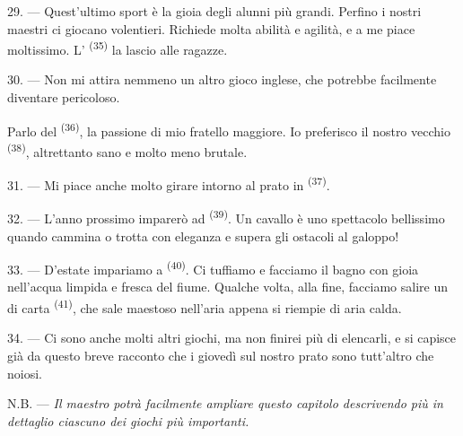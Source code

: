 29. --- Quest'ultimo sport è la gioia degli alunni più grandi. Perfino i nostri
maestri ci giocano volentieri. Richiede molta abilità e agilità, e a me piace
moltissimo. L' \textsuperscript{(35)} la lascio alle ragazze.

30. --- Non mi attira nemmeno un altro gioco inglese, che potrebbe facilmente
diventare pericoloso.

Parlo del  \textsuperscript{(36)}, la passione di mio fratello
maggiore. Io preferisco il nostro vecchio 
\textsuperscript{(38)}, altrettanto sano e molto meno brutale.

\VUsaut{4.6mm}
\VUsaut{3.0mm}

31. --- Mi piace anche molto girare intorno al prato in 
\textsuperscript{(37)}.

32. --- L'anno prossimo imparerò ad  \textsuperscript{(39)}.
Un cavallo è uno spettacolo bellissimo quando cammina o trotta con eleganza e supera
gli ostacoli al galoppo!

33. --- D'estate impariamo a  \textsuperscript{(40)}. Ci tuffiamo e
facciamo il bagno con gioia nell'acqua limpida e fresca del fiume. Qualche volta, alla
fine, facciamo salire un  di carta \textsuperscript{(41)}, che sale
maestoso nell'aria appena si riempie di aria calda.

34. --- Ci sono anche molti altri giochi, ma non finirei più di elencarli, e si capisce
già da questo breve racconto che i giovedì sul nostro prato sono tutt'altro che
noiosi.

N.B. --- \textit{Il maestro potrà facilmente ampliare questo capitolo descrivendo più
in dettaglio ciascuno dei giochi più importanti.}
\VUsaut{6.0mm}
\VUfilet{22mm}
